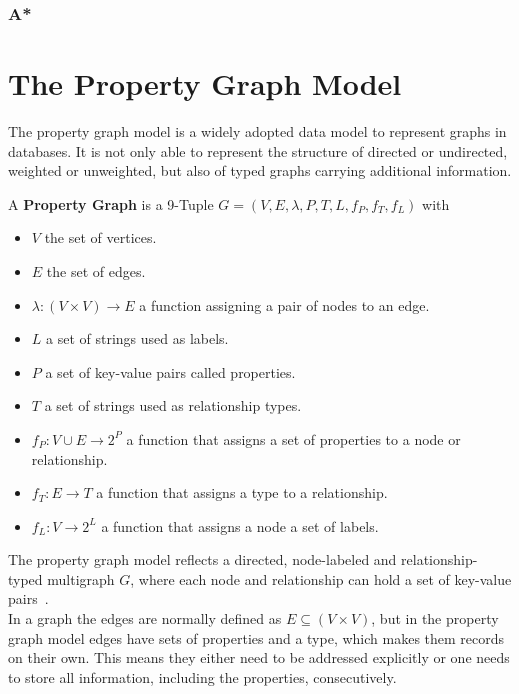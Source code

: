         
        \subsubsection*{A*}
        


\section{The Property Graph Model}\label{\positionnumber}
    The property graph model is a widely adopted data model to represent graphs in databases.
    It is not only able to represent the structure of directed or undirected, weighted or unweighted, but also of typed graphs carrying additional information.

    A \textbf{Property Graph} is a 9-Tuple $G = (V, E, \lambda, P, T, L, f_P, f_T, f_L)$ with 
    \begin{itemize}
        \item $V$ the set of vertices.
        \item $E$ the set of edges.
        \item $\lambda: (V \times V) \rightarrow E$ a function assigning a pair of nodes to an edge.
        \item $L$ a set of strings used as labels.
        \item $P$ a set of key-value pairs called properties.
        \item $T$ a set of strings used as relationship types.
        \item $f_P: V \cup E \rightarrow 2^P$ a function that assigns a set of properties to a node or relationship.
        \item $f_T: E \rightarrow T$ a function that assigns a type to  a relationship.
        \item  $f_L: V \rightarrow 2^L$ a function that assigns a node a set of labels.
    \end{itemize} 
    \smallskip
    The property graph model reflects a directed, node-labeled and relationship-typed multigraph $G$, where each node and relationship can hold a set of key-value pairs~\cite{angles2018property, rodriguez2012graph}. \\
    In a graph the edges are normally defined as $E \subseteq (V \times V)$, but in the property graph model edges have sets of properties and a type, which makes them records on their own. 
    This means they either need to be addressed explicitly or one needs to store all information, including the properties, consecutively. 
